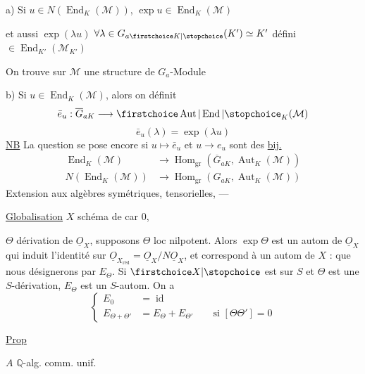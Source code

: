 a) Si $u\in N(\operatorname{End}_K(\mathcal M))$, $\exp u\in\operatorname{End}_K(\mathcal M)$

et aussi $\exp(\lambda u)$ $\forall\lambda\in G_{a\unsure{K}}(K')\simeq K'$ défini $\in\operatorname{End}_{K'}(\mathcal M_{K'})$

On trouve sur $\mathcal M$ une structure de $G_a$-Module 

b) Si $u\in\operatorname{End}_K(\mathcal M)$, alors on définit
\[
\bar e_u:\overline G_{aK}\longrightarrow\unsure{\operatorname{Aut}|\operatorname{End}}_K(\mathcal M)
\]
\[
\bar e_u(\lambda)=\exp(\lambda u)
\]
\uline{NB} La question se pose encore si $u\longmapsto\bar e_u$ et $u\longrightarrow e_u$ sont des \uline{bij.}
\[
\begin{aligned}
\operatorname{End}_K(\mathcal M)&\longrightarrow\operatorname{Hom}_{\mathrm{gr}}(\overline G_{aK},\operatorname{Aut}_K(\mathcal M))\\
N(\operatorname{End}_K(\mathcal M))&\longrightarrow\operatorname{Hom}_{\mathrm{gr}}(G_{aK},\operatorname{Aut}_K(\mathcal M))
\end{aligned}
\]
Extension aux  algèbres symétriques, tensorielles,  ---


\uline{Globalisation}  $X$ schéma de car 0,

$\Theta$  dérivation de $\underline O_X$, supposons $\Theta$ loc nilpotent. Alors $\exp\Theta$ est un autom de $\underline O_X$ qui induit l'identité sur $\underline O_{X_{\mathrm{réd}}}=\underline O_X/N\underline O_X$, et correspond à un autom de $X$ : que nous désignerons par $E_\Theta$. Si $\unsure{X}$ est sur $S$ et $\Theta$ est une $S$-dérivation, $E_\Theta$ est un $S$-autom. On a
\[
\left\{\begin{aligned}
E_0&=\operatorname{id}\\
E_{\Theta+\Theta'}&=E_\Theta+E_{\Theta'}\qquad\text{si }[\Theta\Theta']=0
\end{aligned}\right.
\]

\uline{Prop}

$A$ $\mathbb{Q}$-alg. comm. unif.

